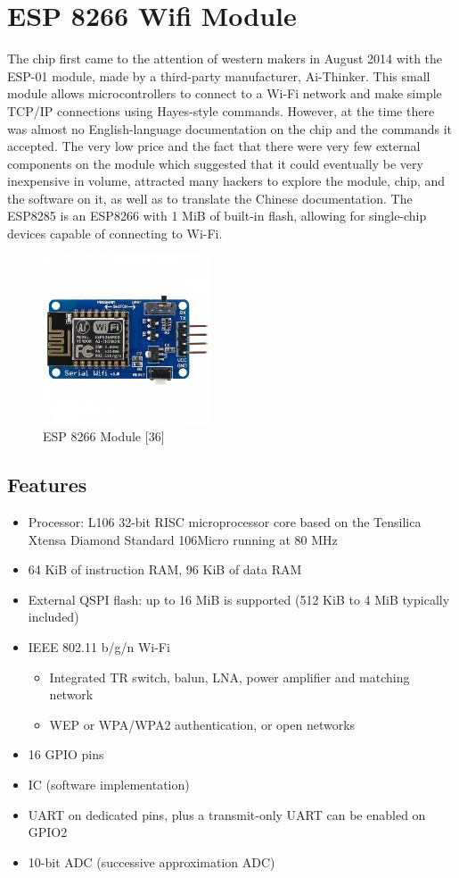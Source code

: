 \documentclass[twoside,a4paper,16pt]{book}
\begin{document}
{{\section{ESP 8266 Wifi Module }
The chip first came to the attention of western makers in August 2014 with the ESP-01 module, made by a third-party manufacturer, Ai-Thinker. This small module allows microcontrollers to connect to a Wi-Fi network and make simple TCP/IP connections using Hayes-style commands. However, at the time there was almost no English-language documentation on the chip and the commands it accepted. The very low price and the fact that there were very few external components on the module which suggested that it could eventually be very inexpensive in volume, attracted many hackers to explore the module, chip, and the software on it, as well as to translate the Chinese documentation.
The ESP8285 is an ESP8266 with 1 MiB of built-in flash, allowing for single-chip devices capable of connecting to Wi-Fi.
\begin{figure}[ht!]
	\begin{center}
		\includegraphics[width=5.0cm]{16.jpg}
		\caption{ESP 8266 Module [36]}
	\end{center}
\end{figure}
\subsection*{Features}
\begin{itemize}
	\item Processor: L106 32-bit RISC microprocessor core based on the Tensilica Xtensa Diamond Standard 106Micro running at 80 MHz
	\item 64 KiB of instruction RAM, 96 KiB of data RAM
	\item External QSPI flash: up to 16 MiB is supported (512 KiB to 4 MiB typically included)
	\item IEEE 802.11 b/g/n Wi-Fi
	\begin{itemize}
		\item Integrated TR switch, balun, LNA, power amplifier and matching network
		\item WEP or WPA/WPA2 authentication, or open networks
	\end{itemize}
	\item 16 GPIO pins
	\item IC (software implementation)
	\item UART on dedicated pins, plus a transmit-only UART can be enabled on GPIO2
	\item 10-bit ADC (successive approximation ADC)
	

\end{itemize}}}
\end{document}
